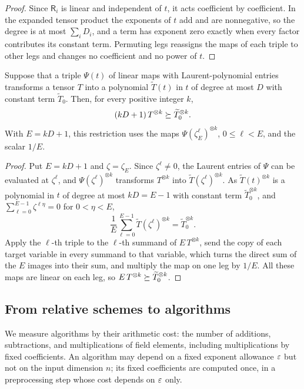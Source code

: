 \begin{proof}
Since \(\mathsf R_i\) is linear and independent of \(t\), it acts
coefficient by coefficient. In the expanded tensor product the exponents of
\(t\) add and are nonnegative, so the degree is at most \(\sum_iD_i\), and
a term has exponent zero exactly when every factor contributes its constant
term. Permuting legs reassigns the maps of each triple to other legs and
changes no coefficient and no power of \(t\).
\end{proof}

\begin{lemma}\label{lem:exactification}
Suppose that a triple \(\Psi(t)\) of linear maps with Laurent-polynomial
entries transforms a tensor \(T\) into a polynomial \(\widetilde T(t)\) in
\(t\) of degree at most \(D\) with constant term \(\widetilde T_0\). Then,
for every positive integer \(k\),
\[
 (kD+1)\,T^{\otimes k}\succeq\widetilde T_0^{\otimes k}.
\]
With \(E=kD+1\), this restriction uses the maps
\(\Psi(\zeta_E^\ell)^{\otimes k}\), \(0\le\ell<E\), and the scalar \(1/E\).
\end{lemma}

\begin{proof}
Put \(E=kD+1\) and \(\zeta=\zeta_E\). Since \(\zeta^\ell\ne0\), the
Laurent entries of \(\Psi\) can be evaluated at \(\zeta^\ell\), and
\(\Psi(\zeta^\ell)^{\otimes k}\) transforms \(T^{\otimes k}\) into
\(\widetilde T(\zeta^\ell)^{\otimes k}\). As \(\widetilde T(t)^{\otimes k}\)
is a polynomial in \(t\) of degree at most \(kD=E-1\) with constant term
\(\widetilde T_0^{\otimes k}\), and
\(\sum_{\ell=0}^{E-1}\zeta^{\ell\eta}=0\) for \(0<\eta<E\),
\[
 \frac1E\sum_{\ell=0}^{E-1}\widetilde T(\zeta^\ell)^{\otimes k}
 =\widetilde T_0^{\otimes k}.
\]
Apply the \(\ell\)-th triple to the \(\ell\)-th summand of
\(E\,T^{\otimes k}\), send the copy of each target variable in every
summand to that variable, which turns the direct sum of the \(E\) images
into their sum, and multiply the map on one leg by \(1/E\). All these maps
are linear on each leg, so \(E\,T^{\otimes k}\succeq\widetilde
T_0^{\otimes k}\).
\end{proof}

\subsection{From relative schemes to algorithms}
\label{subsec:relative-schemes}

We measure algorithms by their arithmetic cost: the number of additions,
subtractions, and multiplications of field elements, including
multiplications by fixed coefficients. An algorithm may depend on a fixed
exponent allowance \(\varepsilon\) but not on the input dimension \(n\); its fixed
coefficients are computed once, in a preprocessing step whose cost depends
on \(\varepsilon\) only.

